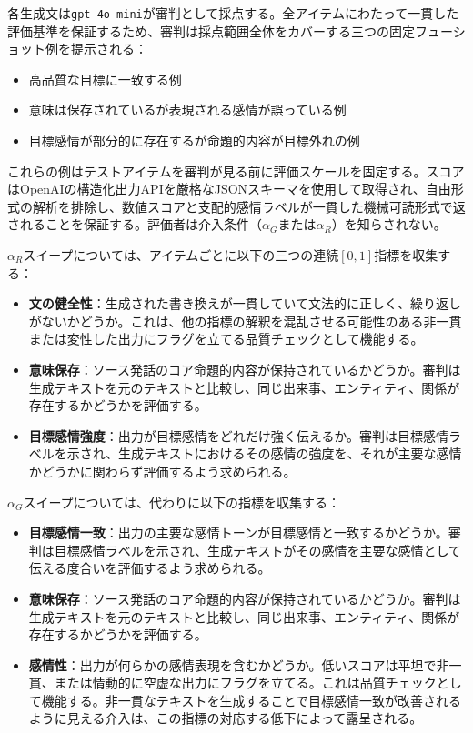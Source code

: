 各生成文は\texttt{gpt-4o-mini}が審判として採点する。全アイテムにわたって一貫した評価基準を保証するため、審判は採点範囲全体をカバーする三つの固定フューショット例を提示される：

\begin{itemize}
  \item 高品質な目標に一致する例
  \item 意味は保存されているが表現される感情が誤っている例
  \item 目標感情が部分的に存在するが命題的内容が目標外れの例
\end{itemize}

これらの例はテストアイテムを審判が見る前に評価スケールを固定する。スコアはOpenAIの構造化出力APIを厳格なJSONスキーマを使用して取得され、自由形式の解析を排除し、数値スコアと支配的感情ラベルが一貫した機械可読形式で返されることを保証する。評価者は介入条件（$\alpha_G$または$\alpha_R$）を知らされない。\par

$\alpha_R$スイープについては、アイテムごとに以下の三つの連続$[0,1]$指標を収集する：
\begin{itemize}
  \item \textbf{文の健全性}：生成された書き換えが一貫していて文法的に正しく、繰り返しがないかどうか。これは、他の指標の解釈を混乱させる可能性のある非一貫または変性した出力にフラグを立てる品質チェックとして機能する。
  \item \textbf{意味保存}：ソース発話のコア命題的内容が保持されているかどうか。審判は生成テキストを元のテキストと比較し、同じ出来事、エンティティ、関係が存在するかどうかを評価する。
  \item \textbf{目標感情強度}：出力が目標感情をどれだけ強く伝えるか。審判は目標感情ラベルを示され、生成テキストにおけるその感情の強度を、それが主要な感情かどうかに関わらず評価するよう求められる。
\end{itemize}

$\alpha_G$スイープについては、代わりに以下の指標を収集する：

\begin{itemize}
  \item \textbf{目標感情一致}：出力の主要な感情トーンが目標感情と一致するかどうか。審判は目標感情ラベルを示され、生成テキストがその感情を主要な感情として伝える度合いを評価するよう求められる。
  \item \textbf{意味保存}：ソース発話のコア命題的内容が保持されているかどうか。審判は生成テキストを元のテキストと比較し、同じ出来事、エンティティ、関係が存在するかどうかを評価する。
  \item \textbf{感情性}：出力が何らかの感情表現を含むかどうか。低いスコアは平坦で非一貫、または情動的に空虚な出力にフラグを立てる。これは品質チェックとして機能する。非一貫なテキストを生成することで目標感情一致が改善されるように見える介入は、この指標の対応する低下によって露呈される。
\end{itemize}

